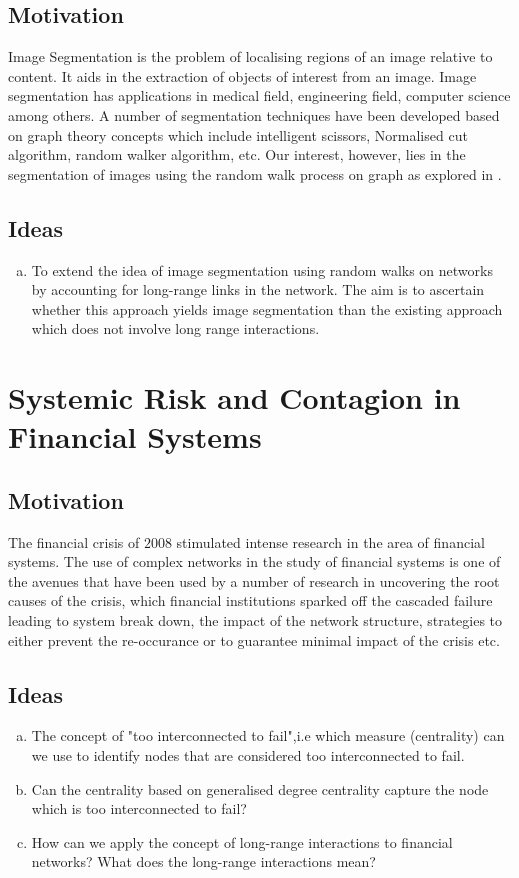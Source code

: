 \documentclass[10pt,a4paper]{article}
\begin{document}
    \subsection{Motivation}
    Image Segmentation is the problem of localising regions of an image relative to content. It aids in the extraction of objects of interest from an image. Image segmentation has applications in medical field, engineering field, computer science among others. A number of segmentation techniques have been developed based on graph theory concepts which include intelligent scissors, Normalised cut algorithm, random walker algorithm, etc. Our interest, however, lies in the segmentation of images using the random walk process on graph as explored in \citep{grady2006random}.
    \subsection{Ideas}
    \begin{enumerate}[a)]
    	\item To extend the idea of image segmentation using random walks on networks by accounting for long-range links in the network. The aim is to ascertain whether this approach yields image segmentation than the existing approach which does not involve long range interactions.
    \end{enumerate}
    \section{Systemic Risk and Contagion in Financial Systems}
    \subsection{Motivation}
    The financial crisis of $2008$ stimulated intense research in the area of financial systems. The use of complex networks in the study of financial systems is one of the avenues that have been used by a number of research in uncovering the root causes of the crisis, which financial institutions sparked off the cascaded failure leading to system break down, the impact of the network structure, strategies to  either prevent the re-occurance or to guarantee minimal impact of the crisis etc. 
    \subsection{Ideas}
    \begin{enumerate}[a)]
    	\item The concept of "too interconnected to fail",i.e which measure (centrality) can we use to identify nodes that are considered too interconnected to fail.
    	\item Can the centrality based on generalised degree centrality capture the node which is too interconnected to fail?
    	\item How can we apply the concept of long-range interactions to financial networks? What does the long-range interactions mean?
    \end{enumerate}
\end{document}
